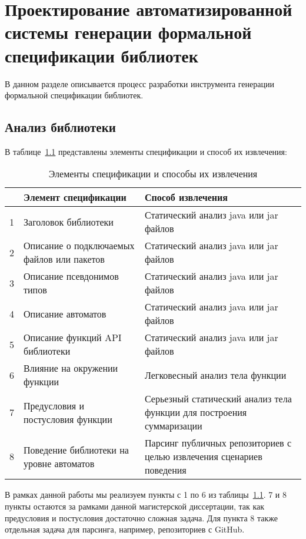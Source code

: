 \chapter{Проектирование автоматизированной системы генерации формальной спецификации библиотек}

В данном разделе описывается процесс разработки инструмента генерации формальной спецификации библиотек.

\section{Анализ библиотеки}

В таблице~\ref{tabular:first_tab} представлены элементы спецификации и способ их извлечения:

\begin{table}[H]
	\caption{Элементы спецификации и способы их извлечения}
	\begin{center}
		\begin{tabular}{|l|l|l|}
			\hline
			& Элемент спецификации & Способ извлечения\tabularnewline \hline

			1 & Заголовок библиотеки & Статический анализ java или jar файлов\tabularnewline \hline
			2 & Описание о подключаемых файлов или пакетов & Статический анализ java или jar файлов\tabularnewline \hline
			3 & Описание псевдонимов типов & Статический анализ java или jar файлов\tabularnewline \hline
			4 & Описание автоматов & Статический анализ java или jar файлов\tabularnewline \hline
			5 & Описание функций API библиотеки & Статический анализ java или jar файлов\tabularnewline \hline
			6 & Влияние на окружении функции & Легковесный анализ тела функции\tabularnewline \hline
		    7 & Предусловия и постусловия функции & Серьезный статический анализ тела функции для построения суммаризации\tabularnewline \hline
			8 & Поведение библиотеки на уровне автоматов & Парсинг публичных репозиториев с целью извлечения сценариев поведения\tabularnewline \hline
		\end{tabular}
		\label{tabular:first_tab}
	\end{center}
\end{table}

В рамках данной работы мы реализуем пункты с 1 по 6 из таблицы~\ref{tabular:first_tab}.
7 и 8 пункты остаются за рамками данной магистерской диссертации, так как предусловия и постусловия достаточно сложная задача.
Для пункта 8 также отдельная задача для парсинга, например, репозиториев с GitHub.

